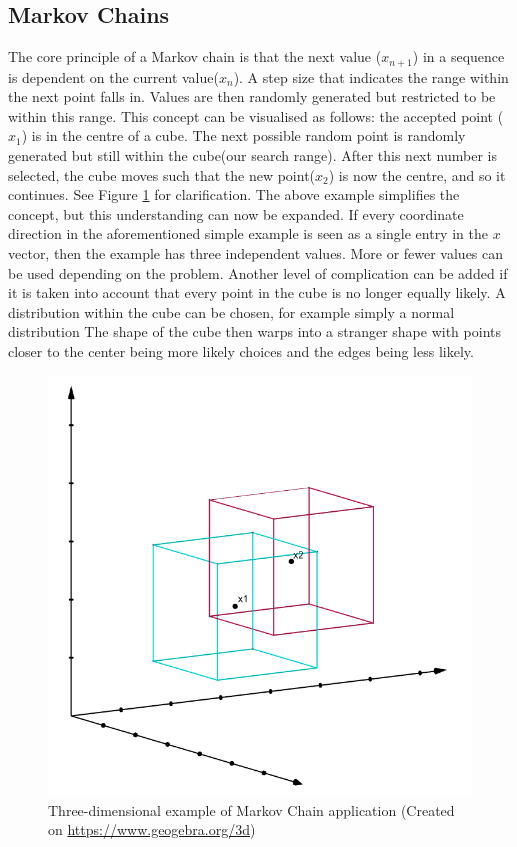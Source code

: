 	\subsection{Markov Chains}	\label{markovexpl}
	The core principle of a Markov chain is that the next value ($x_{n+1}$) in a sequence is dependent on the current value($x_n$). 
	A step size that indicates the range within the next point falls in.
	Values are then randomly generated but restricted to be within this range.
	This concept can be visualised as follows: the accepted point ($x_1$) is in the centre of a cube. The next possible random point is randomly generated but still within the cube(our search range). 	
	After this next number is selected, the cube moves such that the new point($x_2$) is now the centre, and so it continues.
	See Figure \ref{cubeexplfig} for clarification.
	The above example simplifies the concept, but this understanding can now be expanded.
	If every coordinate direction in the aforementioned simple example is seen as a single entry in the $x$ vector, then the example has three independent values.
	More or fewer values can be used depending on the problem.
	Another level of complication can be added if it is taken into account that every point in the cube is no longer equally likely.
	A distribution within the cube can be chosen, for example simply a normal distribution
	The shape of the cube then warps into a stranger shape with points closer to the center being more likely choices and the edges being less likely.
	\begin{figure}	
	\centering
	\includegraphics[width=0.55\linewidth]{figures/MC_cubes.png}
	\caption{Three-dimensional example of Markov Chain application (Created on \url{https://www.geogebra.org/3d})}
	\label{cubeexplfig}
	\end{figure}
	
